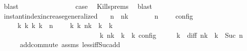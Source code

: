 \begin{isabellebody}
\ blast\isanewline
\ \ \ \ \ \ \isamarkupfalse%
\isanewline
\ \ \ \ \ \ \isamarkupfalse%
\ \isamarkupfalse%
\ {\isacharquery}case\ \isamarkupfalse%
\ Kills{\isachardot}prems{\isacharparenleft}{}{\isacharparenright}\ \isamarkupfalse%
\ blast\isanewline
\ \ \isamarkupfalse%
\isanewline
{}\isamarkupfalse%
%
\endisatagproof
{\isafoldproof}%
%
\isadelimproof
\isanewline
%
\endisadelimproof
\isanewline
{}\isamarkupfalse%
\ instant{\isacharunderscore}index{\isacharunderscore}increase{\isacharunderscore}generalized{\isacharcolon}\isanewline
\ \ \ {\isacartoucheopen}n\ {\isacharless}\ n\isactrlsub k{\isacartoucheclose}\isanewline
\ \ \ {\isacartoucheopen}{\isasymrho}\ {\isasymin}\ {\isasymlbrakk}\ {\isasymGamma}{\isacharcomma}\ n\ {\isasymturnstile}\ {\isasymPsi}\ {\isasymtriangleright}\ {\isasymPhi}\ {\isasymrbrakk}\isactrlsub c\isactrlsub o\isactrlsub n\isactrlsub f\isactrlsub i\isactrlsub g{\isacartoucheclose}\isanewline
\ \ \ \ \ {\isacartoucheopen}{\isasymexists}{\isasymGamma}\isactrlsub k\ {\isasymPsi}\isactrlsub k\ {\isasymPhi}\isactrlsub k\ k{\isachardot}\ {\isacharparenleft}{\isacharparenleft}{\isasymGamma}{\isacharcomma}\ n\ {\isasymturnstile}\ {\isasymPsi}\ {\isasymtriangleright}\ {\isasymPhi}{\isacharparenright}\ {\isasymhookrightarrow}\isactrlbsup k\isactrlesup \ {\isacharparenleft}{\isasymGamma}\isactrlsub k{\isacharcomma}\ n\isactrlsub k\ {\isasymturnstile}\ {\isasymPsi}\isactrlsub k\ {\isasymtriangleright}\ {\isasymPhi}\isactrlsub k{\isacharparenright}{\isacharparenright}\isanewline
\ \ \ \ \ \ \ \ \ \ \ \ \ \ \ \ \ \ \ \ \ \ \ \ \ {\isasymand}\ {\isasymrho}\ {\isasymin}\ {\isasymlbrakk}\ {\isasymGamma}\isactrlsub k{\isacharcomma}\ n\isactrlsub k\ {\isasymturnstile}\ {\isasymPsi}\isactrlsub k\ {\isasymtriangleright}\ {\isasymPhi}\isactrlsub k\ {\isasymrbrakk}\isactrlsub c\isactrlsub o\isactrlsub n\isactrlsub f\isactrlsub i\isactrlsub g{\isacartoucheclose}\isanewline
%
\isadelimproof
%
\endisadelimproof
%
\isatagproof
{}\isamarkupfalse%
\ {\isacharminus}\isanewline
\ \ \isamarkupfalse%
\ {\isasymdelta}k\ \ diff{\isacharcolon}\ {\isacartoucheopen}n\isactrlsub k\ {\isacharequal}\ {\isasymdelta}k\ {\isacharplus}\ Suc\ n{\isacartoucheclose}\isanewline
\ \ \ \ \isamarkupfalse%
\ add{\isachardot}commute\ assms{\isacharparenleft}{}{\isacharparenright}\ less{\isacharunderscore}iff{\isacharunderscore}Suc{\isacharunderscore}add\ \isamarkupfalse%

\end{isabellebody}
